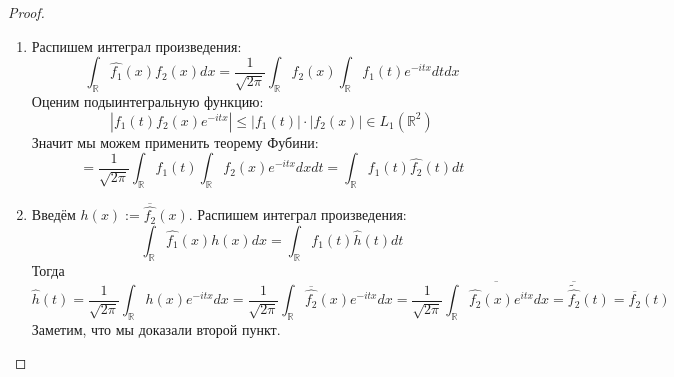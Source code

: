 \documentclass[a4paper,12pt]{article}
\renewcommand{\leq}{\ensuremath{\leqslant}}
\theoremstyle{plain}
\theoremstyle{definition}
\theoremstyle{remark}
\begin{document}
\begin{proof}
	\begin{enumerate}
		\item Распишем интеграл произведения:
		      \[
			      \int_\mathbb{R}\hat{f_1}(x)f_2(x)dx = \frac{1}{\sqrt{2\pi}}\int_\mathbb{R}f_2(x)\int_\mathbb{R}f_1(t)e^{-itx}dtdx
		      \]
		      Оценим подыинтегральную функцию:
		      \[|f_1(t)f_2(x)e^{-itx}| \leq |f_1(t)|\cdot|f_2(x)| \in L_1(\mathbb{R}^2)\]
		      Значит мы можем применить теорему Фубини:
		      \[= \frac{1}{\sqrt{2\pi}}\int_\mathbb{R}f_1(t)\int_\mathbb{R}f_2(x)e^{-itx}dxdt = \int_\mathbb{R}f_1(t)\hat{f_2}(t)dt\]
		\item Введём $h(x) := \overline{\hat{f_2}}(x)$. Распишем интеграл произведения:
		      \[
			      \int_\mathbb{R}\hat{f_1}(x)h(x)dx = \int_\mathbb{R}f_1(t)\hat{h}(t)dt
		      \]
		      Тогда
		      \[
			      \hat{h}(t) = \frac{1}{\sqrt{2\pi}}\int_\mathbb{R}h(x)e^{-itx}dx = \frac{1}{\sqrt{2\pi}}\int_\mathbb{R}\overline{\hat{f_2}}(x)e^{-itx}dx = \frac{1}{\sqrt{2\pi}}\overline{\int_\mathbb{R}\hat{f_2}(x)e^{itx}dx} = \overline{\tilde{\hat{f_2}}}(t) = \overline{f_2}(t)
		      \]
		      Заметим, что мы доказали второй пункт.
	\end{enumerate}
\end{proof}
\end{document}
